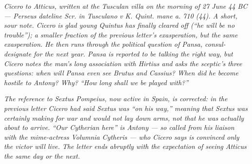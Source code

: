 
\textit{Cicero to Atticus, written at the Tusculan villa on the
morning of 27 June 44 BC --- Perseus dateline \textit{Scr. in
Tusculano v K. Quint. mane a. 710 (44)}. A short, sour note.
Cicero is glad young Quintus has finally cleared off (``he will
be no trouble''); a smaller fraction of the previous letter's
exasperation, but the same exasperation. He then runs through
the political question of Pansa, consul-designate for the next
year. Pansa is reported to be talking the right way, but Cicero
notes the man's long association with Hirtius and asks the
sceptic's three questions: when will Pansa even see Brutus and
Cassius? When did he become hostile to Antony? Why? ``How long
shall we be played with?''}

\textit{The reference to Sextus Pompeius, now active in Spain,
is corrected: in the previous letter Cicero had said Sextus was
``on his way,'' meaning that Sextus was certainly making for
war and would not lay down arms, not that he was actually
about to arrive. ``Our Cytherian here'' is Antony --- so called
from his liaison with the mime-actress Volumnia Cytheris ---
who Cicero says is convinced only the victor will live. The
letter ends abruptly with the expectation of seeing Atticus
the same day or the next.}
